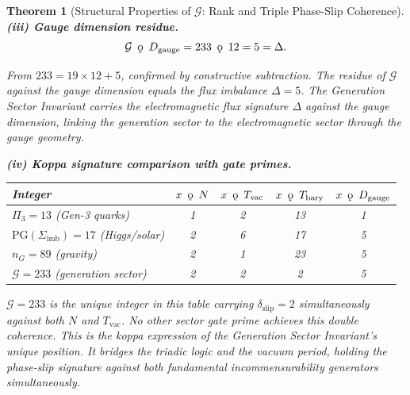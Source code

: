 \documentclass[11pt, letterpaper]{article}
\newcommand{\koppa}{\mathbin{\text{\rm\k{o}}}}
\theoremstyle{definition}
\theoremstyle{plain}
\newtheorem{theorem}{Theorem}[section]
\begin{document}
\begin{theorem}[Structural Properties of $\mathcal{G}$: Rank and Triple Phase-Slip Coherence]
\noindent\textbf{(iii) Gauge dimension residue.}
\begin{equation}
    \mathcal{G} \;\mathbin{\koppa}\; D_\mathrm{gauge} = 233 \;\mathbin{\koppa}\; 12 = 5 = \Delta.
    \label{eq:kop_Dgauge}
\end{equation}

From $233 = 19 \times 12 + 5$, confirmed by constructive subtraction. The residue of $\mathcal{G}$ against the gauge dimension equals the flux imbalance $\Delta = 5$. The Generation Sector Invariant carries the electromagnetic flux signature $\Delta$ against the gauge dimension, linking the generation sector to the electromagnetic sector through the gauge geometry.

\noindent\textbf{(iv) Koppa signature comparison with gate primes.}

\medskip
\begin{center}
\begin{tabular}{lcccc}
\hline
Integer & $x \;\mathbin{\koppa}\; N$ & $x \;\mathbin{\koppa}\; T_\mathrm{vac}$ & $x \;\mathbin{\koppa}\; T_\mathrm{bary}$ & $x \;\mathbin{\koppa}\; D_\mathrm{gauge}$ \\
\hline
$\Pi_3 = 13$ (Gen-3 quarks) & 1 & 2 & 13 & 1 \\
$\mathrm{PG}(\Sigma_\mathrm{imb}) = 17$ (Higgs/solar) & 2 & 6 & 17 & 5 \\
$n_G = 89$ (gravity) & 2 & 1 & 23 & 5 \\
$\mathcal{G} = 233$ (generation sector) & 2 & 2 & 2 & 5 \\
\hline
\end{tabular}
\end{center}

\medskip
$\mathcal{G} = 233$ is the unique integer in this table carrying $\delta_\mathrm{slip} = 2$ simultaneously against both $N$ and $T_\mathrm{vac}$. No other sector gate prime achieves this double coherence. This is the koppa expression of the Generation Sector Invariant's unique position. It bridges the triadic logic and the vacuum period, holding the phase-slip signature against both fundamental incommensurability generators simultaneously.
\end{theorem}
\end{document}
